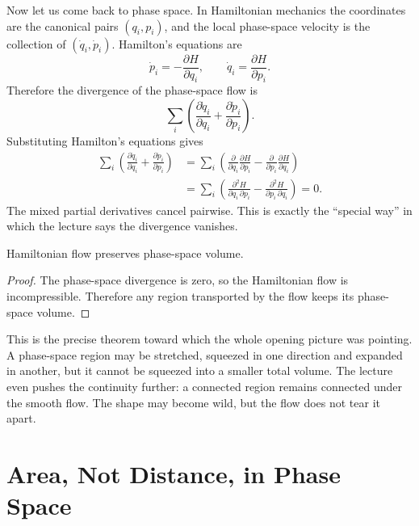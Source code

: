 Now let us come back to phase space. In Hamiltonian mechanics the coordinates are the canonical pairs \((q_i,p_i)\), and the local phase-space velocity is the collection of \((\dot q_i,\dot p_i)\). Hamilton's equations are
\begin{equation}
\dot p_i=-\frac{\partial H}{\partial q_i},
\qquad
\dot q_i=\frac{\partial H}{\partial p_i}.
\end{equation}
Therefore the divergence of the phase-space flow is
\begin{equation}
\sum_i\left(\frac{\partial \dot q_i}{\partial q_i}+\frac{\partial \dot p_i}{\partial p_i}\right).
\end{equation}
Substituting Hamilton's equations gives
\begin{align}
\sum_i\left(\frac{\partial \dot q_i}{\partial q_i}+\frac{\partial \dot p_i}{\partial p_i}\right)
&=
\sum_i\left(
\frac{\partial}{\partial q_i}\frac{\partial H}{\partial p_i}
-
\frac{\partial}{\partial p_i}\frac{\partial H}{\partial q_i}
\right) \\
&=
\sum_i\left(
\frac{\partial^2 H}{\partial q_i\,\partial p_i}
-
\frac{\partial^2 H}{\partial p_i\,\partial q_i}
\right)=0.
\end{align}
The mixed partial derivatives cancel pairwise. This is exactly the ``special way'' in which the lecture says the divergence vanishes.

\begin{theorem}
Hamiltonian flow preserves phase-space volume.
\end{theorem}

\begin{proof}
The phase-space divergence is zero, so the Hamiltonian flow is incompressible. Therefore any region transported by the flow keeps its phase-space volume.
\end{proof}

This is the precise theorem toward which the whole opening picture was pointing. A phase-space region may be stretched, squeezed in one direction and expanded in another, but it cannot be squeezed into a smaller total volume. The lecture even pushes the continuity further: a connected region remains connected under the smooth flow. The shape may become wild, but the flow does not tear it apart.

\section{Area, Not Distance, in Phase Space}


